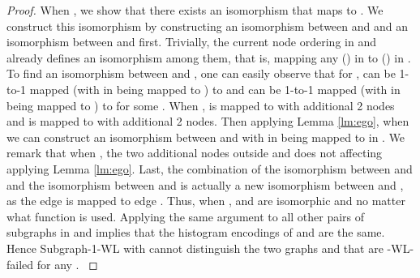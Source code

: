 \begin{proof}
{When , we show that there exists an isomorphism that maps  to . We construct this isomorphism by constructing an isomorphism between  and  and an isomorphism between  and  first. Trivially, the current node ordering in  and  already defines an isomorphism among them, that is, mapping any  () in  to  () in . To find an isomorphism between  and , one can easily observe that for ,  can be 1-to-1 mapped (with  in  being mapped to ) to  and  can be 1-to-1 mapped (with  in  being mapped to ) to  for some . When ,  is mapped to  with additional 2 nodes and  is mapped to  with additional 2 nodes. Then applying Lemma \ref{lm:ego}, when  we can construct an isomorphism between  and  with  in  being mapped to  in . We remark that when , the two additional nodes outside  and  does not affecting applying Lemma \ref{lm:ego}. Last, the combination of the isomorphism between  and  and the isomorphism between  and  is actually a new isomorphism between  and , as the edge  is mapped to edge . Thus, when ,  and  are isomorphic and  no matter what  function is used. Applying the same argument to all other pairs of subgraphs in  and  implies that the histogram encodings of  and  are the same. Hence Subgraph-1-WL with  cannot distinguish the two graphs  and  that are -WL-failed for any .
}
\end{proof}



